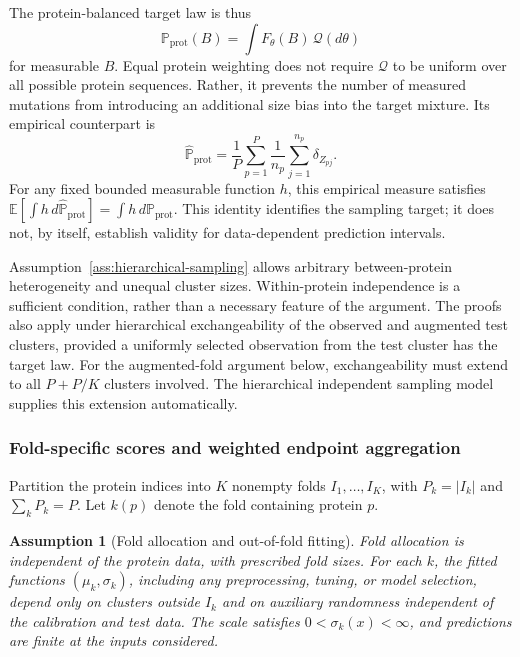 \documentclass[11pt]{article}
\newtheorem{assumption}{Assumption}
\begin{document}
The protein-balanced target law is thus
\begin{equation}
 \mathbb P_{\mathrm{prot}}(B)
 =\int F_\theta(B)\,\mathcal Q(d\theta)
 \label{eq:population-mixture}
\end{equation}
for measurable $B$. Equal protein weighting does not require $\mathcal Q$ to be uniform over all possible protein sequences. Rather, it prevents the number of measured mutations from introducing an additional size bias into the target mixture. Its empirical counterpart is
\begin{equation}
 \widehat{\mathbb P}_{\mathrm{prot}}
 =\frac1P\sum_{p=1}^P\frac1{n_p}
       \sum_{j=1}^{n_p}\delta_{Z_{pj}}.
 \label{eq:empirical-protein-mixture}
\end{equation}
For any fixed bounded measurable function $h$, this empirical measure satisfies
$\mathbb E[\int h\,d\widehat{\mathbb P}_{\mathrm{prot}}]
=\int h\,d\mathbb P_{\mathrm{prot}}$.
This identity identifies the sampling target; it does not, by itself, establish validity for data-dependent prediction intervals.

Assumption~\ref{ass:hierarchical-sampling} allows arbitrary between-protein heterogeneity and unequal cluster sizes. Within-protein independence is a sufficient condition, rather than a necessary feature of the argument. The proofs also apply under hierarchical exchangeability of the observed and augmented test clusters, provided a uniformly selected observation from the test cluster has the target law. For the augmented-fold argument below, exchangeability must extend to all $P+P/K$ clusters involved. The hierarchical independent sampling model supplies this extension automatically.

\subsubsection{Fold-specific scores and weighted endpoint aggregation}

Partition the protein indices into $K$ nonempty folds $I_1,\ldots,I_K$, with $P_k=|I_k|$ and $\sum_kP_k=P$. Let $k(p)$ denote the fold containing protein $p$.

\begin{assumption}[Fold allocation and out-of-fold fitting]
\label{ass:fold-fitting}
Fold allocation is independent of the protein data, with prescribed fold sizes. For each $k$, the fitted functions $(\mu_k,\sigma_k)$, including any preprocessing, tuning, or model selection, depend only on clusters outside $I_k$ and on auxiliary randomness independent of the calibration and test data. The scale satisfies $0<\sigma_k(x)<\infty$, and predictions are finite at the inputs considered.
\end{assumption}
\end{document}

